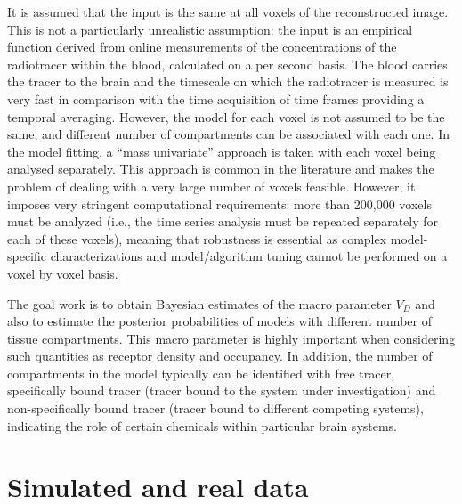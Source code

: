 It is assumed that the input is the same at all voxels of the reconstructed
image. This is not a particularly unrealistic assumption: the input is an
empirical function derived from online measurements of the concentrations
of the radiotracer within the blood, calculated on a per second basis. The
blood carries the tracer to the brain and the timescale on which the
radiotracer is measured is very fast in comparison with the time
acquisition of \pet time frames providing a temporal averaging. However,
the model for each voxel is not assumed to be the same, and different
number of compartments can be associated with each one. In the model
fitting, a ``mass univariate'' approach is taken with each voxel being
analysed separately. This approach is common in the literature and makes
the problem of dealing with a very large number of voxels feasible.
However, it imposes very stringent computational requirements: more than
200,000 voxels must be analyzed (i.e., the time series analysis must be
repeated separately for each of these voxels), meaning that robustness is
essential as complex model-specific characterizations and model/algorithm
tuning cannot be performed on a voxel by voxel basis.

The goal work is to obtain Bayesian estimates of the macro parameter $V_D$ and
also to estimate the posterior probabilities of models with different number
of tissue compartments. This macro parameter is highly important when
considering such quantities as receptor density and occupancy. In addition,
the number of compartments in the model typically can be identified with free
tracer, specifically bound tracer (tracer bound to the system under
investigation) and non-specifically bound tracer (tracer bound to different
competing systems), indicating the role of certain chemicals within particular
brain systems.

\section{Simulated and real \protect\pet data}
\label{sec:Simulated and real pet data}

